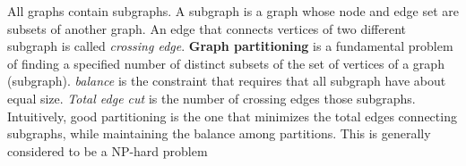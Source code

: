 All graphs contain subgraphs. A subgraph is a graph whose node and edge set are
subsets of another graph. An edge that connects vertices of two different
subgraph is called \emph{crossing edge}. \textbf{Graph partitioning} is a
fundamental problem of finding a specified number of distinct subsets of the set
of vertices of a graph (subgraph). \emph{balance} is the constraint that
requires that all subgraph have about equal size. \emph{Total edge cut} is the
number of crossing edges those subgraphs. Intuitively, good partitioning is the
one that minimizes the total edges connecting subgraphs, while maintaining the
balance among partitions. This is generally considered to be a NP-hard problem
\cite{10.1006/jpdc.1997.1404}
